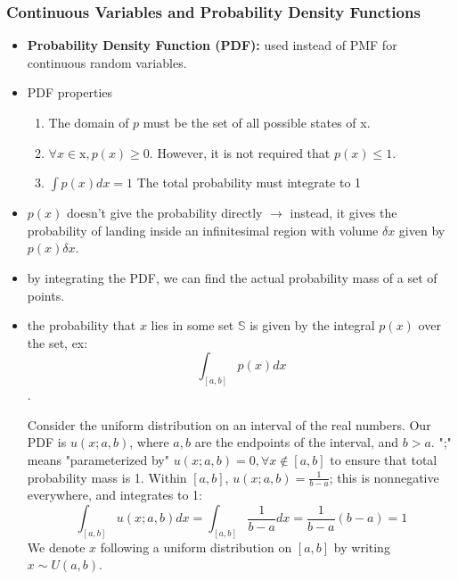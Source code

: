 \subsubsection{Continuous Variables and Probability Density Functions}
\begin{itemize}
    \item \textbf{Probability Density Function (PDF):} used instead of PMF for continuous random variables.
    \item PDF properties
    \begin{enumerate}
        \item The domain of $p$ must be the set of all possible states of x.
        \item $\forall x \in \text{x}, p(x) \geq 0$. However, it is not required that $p(x) \leq 1$.
        \item $\int p(x) dx = 1$ The total probability must integrate to 1
    \end{enumerate}
    \item $p(x)$ doesn't give the probability directly $\rightarrow$ instead, it gives the probability of landing inside an infinitesimal region with volume $\delta x$ given by $p(x) \delta x$.
    \item by integrating the PDF, we can find the actual probability mass of a set of points.
    \item the probability that $x$ lies in some set $\mathbb{S}$ is given by the integral $p(x)$ over the set, ex:
    $$ \int_{[a, b]}p(x) dx $$.
    \begin{example}
        Consider the uniform distribution on an interval of the real numbers.
        Our PDF is $u(x; a, b)$, where $a, b$ are the endpoints of the interval, and $b > a$. ";" means "parameterized by"
        $u(x; a, b) = 0, \forall x \notin [a, b]$ to ensure that total probability mass is 1.
        Within $[a, b]$, $u(x; a, b) = \frac{1}{b-a}$; this is nonnegative everywhere, and integrates to 1:
        $$ \int_{[a, b]} u(x; a, b) dx = \int_{[a, b]} \frac{1}{b-a} dx = \frac{1}{b-a} (b-a) = 1 $$
        We denote $x$ following a uniform distribution on $[a, b]$ by writing $x \sim U(a, b)$.
    \end{example}
\end{itemize}

